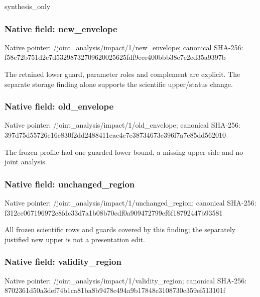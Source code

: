\documentclass[10pt,a4paper]{article}
\begin{document}
\begingroup\raggedright\sloppy synthesis\_\allowbreak{}only\par\endgroup

\subsubsection{Native field: new\_\allowbreak{}envelope}
Native pointer: /joint\_\allowbreak{}analysis/impact/1/new\_\allowbreak{}envelope; canonical SHA-256: f58c72b751d2c7d53298732709620025625fdf9ece400bbb38e7e2ed35a9397b

\begingroup\raggedright\sloppy The retained lower guard,\allowbreak{} parameter roles and complement are explicit. The separate storage finding alone supports the scientific upper/\allowbreak{}status change.\par\endgroup

\subsubsection{Native field: old\_\allowbreak{}envelope}
Native pointer: /joint\_\allowbreak{}analysis/impact/1/old\_\allowbreak{}envelope; canonical SHA-256: 397d75d55726e16e830f2dd2488411eac4c7e38734673e396f7a7e85dd562010

\begingroup\raggedright\sloppy The frozen profile had one guarded lower bound,\allowbreak{} a missing upper side and no joint analysis.\par\endgroup

\subsubsection{Native field: unchanged\_\allowbreak{}region}
Native pointer: /joint\_\allowbreak{}analysis/impact/1/unchanged\_\allowbreak{}region; canonical SHA-256: f312cc067196972e8fdc33d7a1b08b70cdf0a909472799ef6f18792447b93581

\begingroup\raggedright\sloppy All frozen scientific rows and guards covered by this finding;\allowbreak{} the separately justified new upper is not a presentation edit.\par\endgroup

\subsubsection{Native field: validity\_\allowbreak{}region}
Native pointer: /joint\_\allowbreak{}analysis/impact/1/validity\_\allowbreak{}region; canonical SHA-256: 8702361d50a3def74b1ca81ba8b9478c494a9b17848c3108730c359ef513101f
\end{document}
